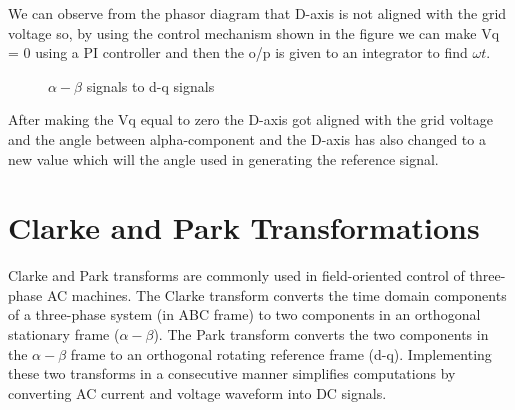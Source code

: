 \documentclass[12pt,a4paper]{book}
\begin{document}
We can observe from the phasor diagram that D-axis is not aligned with the grid voltage so, by using the control mechanism shown in the figure we can make Vq = 0 using a PI controller and then the o/p is given to an integrator to find \(\omega t\).

\begin{figure}[h]
  \centering

  \hfill

  \caption{\(\alpha - \beta\) signals to d-q signals}
  \label{fig:image15}
\end{figure}

After making the Vq equal to zero the D-axis got aligned with the grid voltage and the angle between alpha-component and the D-axis has also changed to a new value which will the angle used in generating the reference signal.

\section{Clarke and Park Transformations}
Clarke and Park transforms are commonly used in field-oriented control of three-phase AC machines. The Clarke transform converts the time domain components of a three-phase system (in ABC frame) to two components in an orthogonal stationary frame (\(\alpha - \beta\)). The Park transform converts the two components in the \(\alpha - \beta\) frame to an orthogonal rotating reference frame (d-q). Implementing these two transforms in a consecutive manner simplifies computations by converting AC current and voltage waveform into DC signals.
\end{document}
